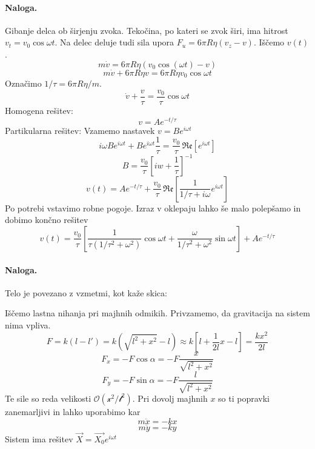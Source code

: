 \documentclass[a4paper]{article}
\newcommand{\vct}[1]{\overrightarrow{#1}}
\begin{document}
\paragraph{Naloga.} Gibanje delca ob širjenju zvoka. Tekočina, po kateri se zvok širi, ima hitrost
$v_t = v_0 \cos\omega t$. Na delec deluje tudi sila upora $F_u = 6\pi R \eta (v_z - v)$. Iščemo $v(t)$.
$$m\dot v = 6\pi R \eta (v_0\cos(\omega t) - v)$$
$$m \dot v + 6 \pi R \eta v = 6\pi R \eta v_0\cos\omega t$$
Označimo $1/\tau = 6\pi R \eta / m$.
$$\dot v + \frac{v}{\tau} = \frac{v_0}{\tau}\cos\omega t$$
Homogena rešitev:
$$v = Ae^{-t/\tau}$$
Partikularna rešitev: Vzamemo nastavek $v = Be^{i \omega t}$
$$i\omega Be^{i\omega t} + Be^{i\omega t}\frac{1}{\tau} = \frac{v_0}{\tau}\,\mathfrak{Re}\left[e^{i\omega t}\right]$$
$$B = \frac{v_0}{\tau}\left[iw + \frac{1}{\tau}\right]^{-1}$$
$$v(t) = Ae^{-t/\tau} + \frac{v_0}{\tau}\,\mathfrak{Re}\left[\frac{1}{1/\tau + i\omega}e^{i\omega t}\right]$$
Po potrebi vstavimo robne pogoje. Izraz v oklepaju lahko še malo polepšamo in dobimo končno rešitev
$$v(t) = \frac{v_0}{\tau}\left[\frac{1}{\tau\left(1/\tau^2 + \omega^2\right)}\cos\omega t +
\frac{\omega}{1/\tau^2 + \omega^2}\sin\omega t\right] + Ae^{-t/\tau}$$
\paragraph{Naloga.} Telo je povezano z vzmetmi, kot kaže skica:
\begin{figure}[h!]
    \centering
\end{figure}
\newline
Iščemo lastna nihanja pri majhnih odmikih. Privzamemo, da gravitacija na sistem nima vpliva.
$$F = k(l-l') = k\left(\sqrt{l^2 + x^2} - l\right) \approx k\left[l + \frac{1}{2l}x - l\right] = \frac{kx^2}{2l}$$
$$F_x = -F\cos\alpha = -F\frac{x}{\sqrt{l^2 + x^2}}$$
$$F_y = -F\sin\alpha = -F\frac{l}{\sqrt{l^2 + x^2}}$$
Te sile so reda velikosti $\mathcal{O(x^2/l^2)}$. Pri dovolj majhnih $x$ so ti popravki zanemarljivi in lahko uporabimo kar
$$m\ddot{x} = -kx$$
$$m\ddot{y} = -ky$$
Sistem ima rešitev $\vct{X} = \vct{X_0}e^{i\omega t}$
\end{document}
